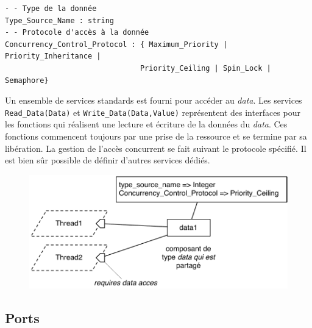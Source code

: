 \documentclass[11pt,a4paper]{paper}
\begin{document}
\begin{appendices}
\begin{center}
 \begin{minipage}[c]{.8\linewidth}
  \lstset{inputencoding=utf8/latin1}
\begin{lstlisting}
- - Type de la donnée
Type_Source_Name : string
- - Protocole d'accès à la donnée
Concurrency_Control_Protocol : { Maximum_Priority | Priority_Inheritance | 
                               Priority_Ceiling | Spin_Lock | Semaphore}
\end{lstlisting}
\end{minipage}
\end{center}

Un ensemble de services standards est fourni pour accéder au {\em data}. Les services {\tt Read\_Data(Data)} et {\tt Write\_Data(Data,Value)} représentent des interfaces pour les fonctions qui réalisent une lecture et écriture de la données du {\em data}. Ces fonctions commencent toujours par une prise de la ressource et se termine par sa libération. La gestion de l'accès concurrent se fait suivant le protocole spécifié. Il est bien sûr possible de définir d'autres services dédiés.


\begin{figure}[htbp]
\begin{center}
\includegraphics[scale=.6]{figures_pdf/data.pdf}
\end{center}
\end{figure}
\FloatBarrier

\subsection{Ports}


\end{appendices}
\end{document}
